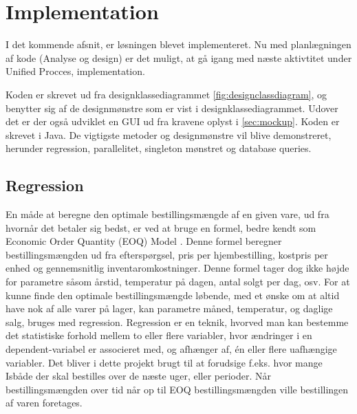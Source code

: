 \chapter{Implementation}\label{ch:implementation}
I det kommende afsnit, er løsningen blevet implementeret. Nu med planlægningen af kode (Analyse og design) er det muligt, at gå igang med næste aktivtitet under Unified Procces, implementation\cite{UnifiedProcess}. 

Koden er skrevet ud fra designklassediagrammet \ref{fig:designclassdiagram}, og benytter sig af de designmønstre som er vist i designklassediagrammet. Udover det er der også udviklet en GUI ud fra kravene oplyst i \ref{sec:mockup}. Koden er skrevet i Java. 
De vigtigste metoder og designmønstre vil blive demonstreret, herunder regression, parallelitet, singleton mønstret og database queries.

\section{Regression}
En måde at beregne den optimale bestillingsmængde af en given vare, ud fra hvornår det betaler sig bedst, er ved at bruge en formel, bedre kendt som Economic Order Quantity (EOQ) Model \cite{EOQ}. Denne formel beregner bestillingsmængden ud fra efterspørgsel, pris per hjembestilling, kostpris per enhed og gennemsnitlig inventaromkostninger. Denne formel tager dog ikke højde for parametre såsom årstid, temperatur på dagen, antal solgt per dag, osv. For at kunne finde den optimale bestillingsmængde løbende, med et ønske om at altid have nok af alle varer på lager, kan parametre måned, temperatur, og daglige salg, bruges med regression. Regression er en teknik, hvorved man kan bestemme det statistiske forhold mellem to eller flere variabler, hvor ændringer i en dependent-variabel er associeret med, og afhænger af, én eller flere uafhængige variabler. Det bliver i dette projekt brugt til at forudsige f.eks. hvor mange Isbåde\cite{Isbåd} der skal bestilles over de næste uger, eller perioder. Når bestillingsmængden over tid når op til EOQ bestillingsmængden ville bestillingen af varen foretages.



